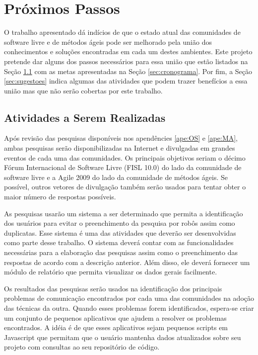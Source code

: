 \chapter{Próximos Passos}
\label{cap:perspectivas}

O trabalho apresentado dá indícios de que o estado atual das
comunidades de software livre e de métodos ágeis pode ser melhorado
pela união dos conhecimentos e soluções encontradas em cada um destes
ambientes. Este projeto pretende dar alguns dos passos necessários
para essa união que estão listados na Seção \ref{sec:atividades} com
as metas apresentadas na Seção \ref{sec:cronograma}. Por fim, a Seção
\ref{sec:sugestoes} indica algumas das atividades que podem trazer
benefícios a essa união mas que não serão cobertas por este trabalho.

\section{Atividades a Serem Realizadas}
\label{sec:atividades}

Após revisão das pesquisas disponíveis nos apendêncies \ref{ape:OS} e
\ref{ape:MA}, ambas pesquisas serão disponibilizadas na Internet e
divulgadas em grandes eventos de cada uma das comunidades. Os
principais objetivos seriam o décimo Fórum Internacional de Software
Livre (FISL 10.0) do lado da comunidade de software livre e a Agile
2009 do lado da comunidade de métodos ágeis. Se possível, outros
vetores de divulgação também serão usados para tentar obter o maior
número de respostas possíveis.

As pesquisas usarão um sistema a ser determinado que permita a
identificação dos usuários para evitar o preenchimento da pesquisa por
robôs assim como duplicatas. Esse sistema é uma das atividades que
deverão ser desenvolvidas como parte desse trabalho. O sistema deverá
contar com as funcionalidades necessárias para a elaboração das
pesquisas assim como o preenchimento das respostas de acordo com a
descrição anterior. Além disso, ele deverá fornecer um módulo de
relatório que permita visualizar os dados gerais facilmente.

Os resultados das pesquisas serão usados na identificação dos
principais problemas de comunicação encontrados por cada uma das
comunidades na adoção das técnicas da outra. Quando esses problemas
forem identificados, espera-se criar um conjunto de pequenos
aplicativos que ajudem a resolver os problemas encontrados. A idéia é
de que esses aplicativos sejam pequenos scripts em Javascript que
permitam que o usuário mantenha dados atualizados sobre seu projeto
com consultas ao seu repositório de código.

